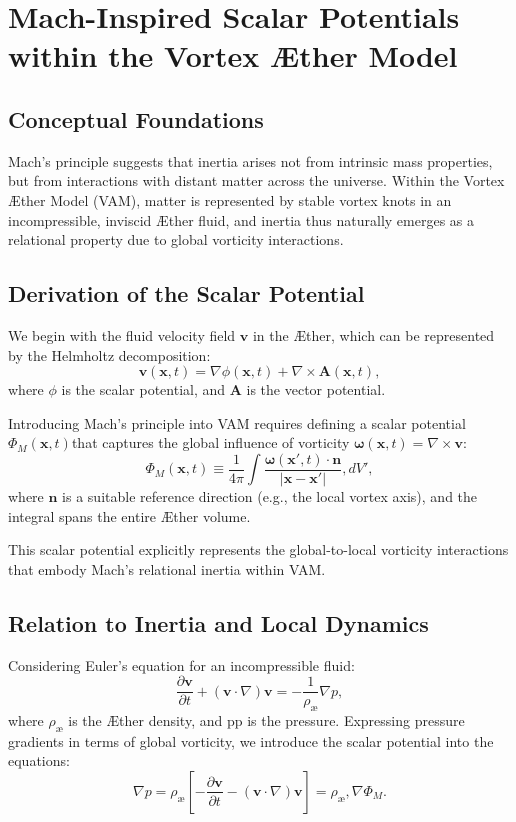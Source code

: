 \documentclass[a4paper,12pt]{article}
\begin{document}
\section{Mach-Inspired Scalar Potentials within the Vortex Æther Model}


\subsection{Conceptual Foundations}
Mach's principle suggests that inertia arises not from intrinsic mass properties, but from interactions with distant matter across the universe. Within the Vortex Æther Model (VAM), matter is represented by stable vortex knots in an incompressible, inviscid Æther fluid, and inertia thus naturally emerges as a relational property due to global vorticity interactions.


\subsection{Derivation of the Scalar Potential}
We begin with the fluid velocity field $\mathbf{v}$ in the Æther, which can be represented by the Helmholtz decomposition:
\begin{equation}
    \mathbf{v}(\mathbf{x}, t) = \nabla \phi(\mathbf{x}, t) + \nabla \times \mathbf{A}(\mathbf{x}, t),
\end{equation}
where $\phi$ is the scalar potential, and $\mathbf{A}$ is the vector potential.


Introducing Mach's principle into VAM requires defining a scalar potential $\Phi_M(\mathbf{x},t) $that captures the global influence of vorticity $\boldsymbol{\omega}(\mathbf{x},t)=\nabla \times \mathbf{v}$:
\begin{equation}
    \Phi_M(\mathbf{x}, t) \equiv \frac{1}{4\pi} \int \frac{\boldsymbol{\omega}(\mathbf{x}',t)\cdot\mathbf{n}}{|\mathbf{x}-\mathbf{x}'|}, dV',
\end{equation}
where $\mathbf{n}$ is a suitable reference direction (e.g., the local vortex axis), and the integral spans the entire Æther volume.


This scalar potential explicitly represents the global-to-local vorticity interactions that embody Mach's relational inertia within VAM.


\subsection{Relation to Inertia and Local Dynamics}
Considering Euler's equation for an incompressible fluid:
\begin{equation}
    \frac{\partial \mathbf{v}}{\partial t}+(\mathbf{v}\cdot \nabla)\mathbf{v}=-\frac{1}{\rho_\text{\ae}}\nabla p,
\end{equation}
where $\rho_\text{\ae}$ is the Æther density, and pp is the pressure. Expressing pressure gradients in terms of global vorticity, we introduce the scalar potential into the equations:
\begin{equation}
    \nabla p = \rho_\text{\ae}\left[-\frac{\partial\mathbf{v}}{\partial t} - (\mathbf{v}\cdot\nabla)\mathbf{v}\right] = \rho_\text{\ae}, \nabla \Phi_M.
\end{equation}
\end{document}
